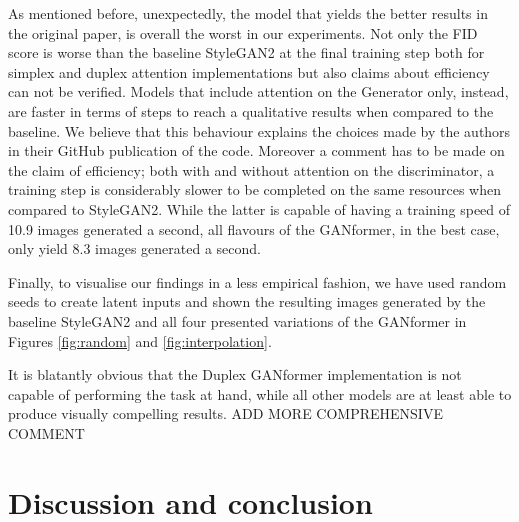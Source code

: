 \documentclass{article}
\begin{document}
	As mentioned before, unexpectedly, the model that yields the better results in the original paper, is 
	overall the worst in our experiments.
	Not only the FID score is worse than the baseline StyleGAN2 at the final training step both for 
	simplex and duplex attention implementations but also claims about efficiency can not be verified.
	Models that include attention on the Generator only, instead, are faster in terms of steps to reach a 
	qualitative results when compared to the baseline.
	We believe that this behaviour explains the choices made by the authors in their GitHub publication 
	of the code.
	Moreover a comment has to be made on the claim of efficiency; both with and without attention on 
	the discriminator, a training step is considerably slower to be completed on the same resources 
	when compared to StyleGAN2.
	While the latter is capable of having a training speed of 10.9 images generated a second, all flavours 
	of the GANformer, in the best case, only yield 8.3 images generated a second.
	
	Finally, to visualise our findings in a less empirical fashion, we have used random 
	seeds to create latent inputs and shown the resulting images generated by the baseline 
	StyleGAN2 and all four presented variations of the GANformer in Figures \ref{fig:random} and 
	\ref{fig:interpolation}.
	
	It is blatantly obvious that the Duplex GANformer implementation is not capable of performing the 
	task at hand, while all other models are at least able to produce visually compelling results.
	ADD MORE COMPREHENSIVE COMMENT
	\clearpage
	
	
	\section{Discussion and conclusion}%
	
\end{document}
